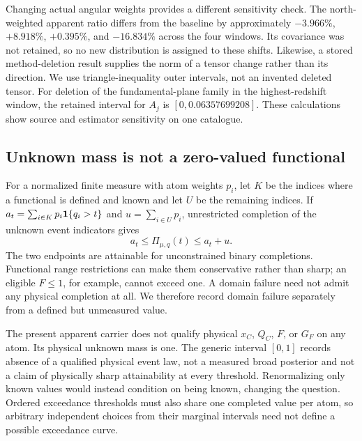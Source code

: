 Changing actual angular weights provides a different sensitivity check. The north-weighted apparent ratio differs from the baseline by approximately $-3.966\%$, $+8.918\%$, $+0.395\%$, and $-16.834\%$ across the four windows. Its covariance was not retained, so no new distribution is assigned to these shifts. Likewise, a stored method-deletion result supplies the norm of a tensor change rather than its direction. We use triangle-inequality outer intervals, not an invented deleted tensor. For deletion of the fundamental-plane family in the highest-redshift window, the retained interval for $A_j$ is $[0,0.06357699208]$. These calculations show source and estimator sensitivity on one catalogue.

\subsection{Unknown mass is not a zero-valued functional}

For a normalized finite measure with atom weights $p_i$, let $K$ be the indices where a functional is defined and known and let $U$ be the remaining indices. If $a_t=\sum_{i\in K}p_i\mathbf 1\{q_i>t\}$ and $u=\sum_{i\in U}p_i$, unrestricted completion of the unknown event indicators gives
\begin{equation}
 a_t\leq\Pi_{\mu,q}(t)\leq a_t+u.
 \label{eq:unknownmass}
\end{equation}
The two endpoints are attainable for unconstrained binary completions. Functional range restrictions can make them conservative rather than sharp; an eligible $F\leq1$, for example, cannot exceed one. A domain failure need not admit any physical completion at all. We therefore record domain failure separately from a defined but unmeasured value.

The present apparent carrier does not qualify physical $x_C$, $Q_C$, $F$, or $G_F$ on any atom. Its physical unknown mass is one. The generic interval $[0,1]$ records absence of a qualified physical event law, not a measured broad posterior and not a claim of physically sharp attainability at every threshold. Renormalizing only known values would instead condition on being known, changing the question. Ordered exceedance thresholds must also share one completed value per atom, so arbitrary independent choices from their marginal intervals need not define a possible exceedance curve.
